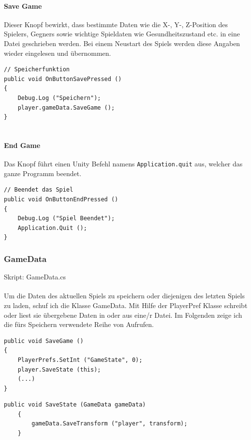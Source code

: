 \paragraph{Save Game}
Dieser Knopf bewirkt, dass bestimmte Daten wie die X-, Y-, Z-Position des Spielers, Gegners sowie wichtige Spieldaten wie Gesundheitszustand etc. in eine Datei geschrieben werden. Bei einem Neustart des Spiels werden diese Angaben wieder eingelesen und übernommen.

\begin{lstlisting}[caption={Save Game}]
// Speicherfunktion
public void OnButtonSavePressed ()
{
	Debug.Log ("Speichern");
	player.gameData.SaveGame ();
}
	
\end{lstlisting}

\paragraph{End Game}
Das Knopf führt einen Unity Befehl namens \lstinline{Application.quit}  aus, welcher das ganze Programm beendet. 

\begin{lstlisting}[caption={End Game}]
// Beendet das Spiel
public void OnButtonEndPressed ()
{
	Debug.Log ("Spiel Beendet");
	Application.Quit ();
}
\end{lstlisting}

\subsubsection{GameData}
Skript: GameData.cs\\\\
Um die Daten des aktuellen Spiels zu speichern oder diejenigen des letzten Spiels zu laden, schuf ich die Klasse GameData.
Mit Hilfe der PlayerPref Klasse schreibt oder liest sie übergebene Daten in oder aus eine/r Datei. 
Im Folgenden zeige ich die fürs Speichern verwendete Reihe von Aufrufen.
\begin{lstlisting}[caption={Methode zur Speicherung des Spielstandes in GameData}]
public void SaveGame ()
{
	PlayerPrefs.SetInt ("GameState", 0);
	player.SaveState (this);
	(...)
}
\end{lstlisting}


\begin{lstlisting}[caption={Methode SaveState in Player}]
	public void SaveState (GameData gameData)
	{
		gameData.SaveTransform ("player", transform);
	}
\end{lstlisting}

